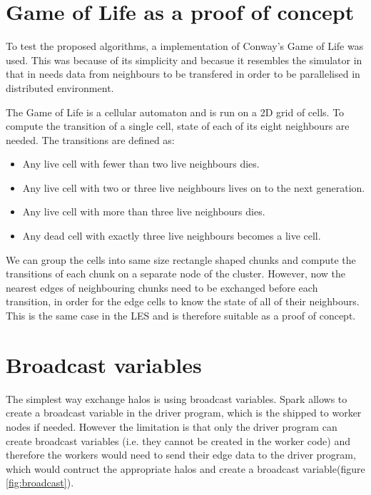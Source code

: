 \documentclass{l4proj}
\begin{document}
\section{Game of Life as a proof of concept}
To test the proposed algorithms, a implementation of Conway's Game of Life was used.
This was because of its simplicity and becasue it resembles the simulator in that
in needs data from neighbours to be transfered in order to be parallelised in 
distributed environment.

The Game of Life is a cellular automaton and is run on a 2D grid of cells. To compute
the transition of a single cell, state of each of its eight neighbours are needed.
The transitions are defined as:

\begin{itemize} 
\item Any live cell with fewer than two live neighbours dies.
\item Any live cell with two or three live neighbours lives on to the next generation.
\item Any live cell with more than three live neighbours dies.
\item Any dead cell with exactly three live neighbours becomes a live cell.
\end{itemize}

We can group the cells into same size rectangle shaped chunks and compute the transitions of each
chunk on a separate node of the cluster. However, now the nearest edges of neighbouring
chunks need to be exchanged before each transition, in order for the edge cells to know
the state of all of their neighbours. This is the same case in the LES and is therefore
suitable as a proof of concept.

\section{Broadcast variables}

The simplest way exchange halos is using broadcast variables. Spark allows to
create a broadcast variable in the driver program, which is the shipped to worker
nodes if needed. However the limitation is that only the driver program can create
broadcast variables (i.e. they cannot be created in the worker code) and therefore
the workers would need to send their edge data to the driver program, which would
contruct the appropriate halos and create a broadcast variable(figure \ref{fig:broadcast}).
\end{document}
